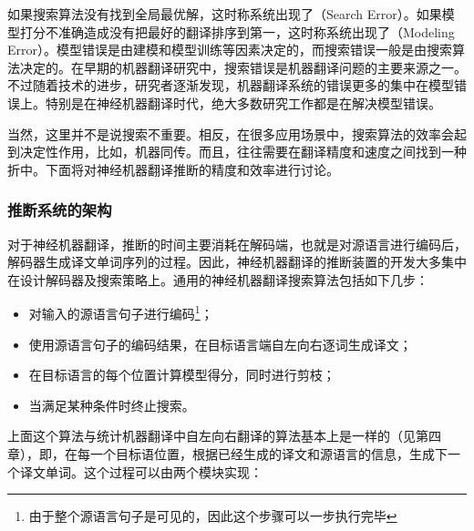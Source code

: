 如果搜索算法没有找到全局最优解，这时称系统出现了{\small{}}（Search Error）。如果模型打分不准确造成没有把最好的翻译排序到第一，这时称系统出现了{\small{}}（Modeling Error）。模型错误是由建模和模型训练等因素决定的，而搜索错误一般是由搜索算法决定的。在早期的机器翻译研究中，搜索错误是机器翻译问题的主要来源之一。不过随着技术的进步，研究者逐渐发现，机器翻译系统的错误更多的集中在模型错误上\cite{DBLP:conf/emnlp/StahlbergB19}。特别是在神经机器翻译时代，绝大多数研究工作都是在解决模型错误。

\parinterval 当然，这里并不是说搜索不重要。相反，在很多应用场景中，搜索算法的效率会起到决定性作用，比如，机器同传\cite{DBLP:journals/corr/abs-1810-08398}。而且，往往需要在翻译精度和速度之间找到一种折中。下面将对神经机器翻译推断的精度和效率进行讨论。


\subsubsection{推断系统的架构}

\parinterval 对于神经机器翻译，推断的时间主要消耗在解码端，也就是对源语言进行编码后，解码器生成译文单词序列的过程。因此，神经机器翻译的推断装置的开发大多集中在设计解码器及搜索策略上。通用的神经机器翻译搜索算法包括如下几步：

\begin{itemize}
\vspace{0.5em}
\item 对输入的源语言句子进行编码\footnote{由于整个源语言句子是可见的，因此这个步骤可以一步执行完毕}；
\vspace{0.5em}
\item 使用源语言句子的编码结果，在目标语言端自左向右逐词生成译文；
\vspace{0.5em}
\item 在目标语言的每个位置计算模型得分，同时进行剪枝；
\vspace{0.5em}
\item 当满足某种条件时终止搜索。
\vspace{0.5em}
\end{itemize}

\parinterval 上面这个算法与统计机器翻译中自左向右翻译的算法基本上是一样的（见第四章），即，在每一个目标语位置，根据已经生成的译文和源语言的信息，生成下一个译文单词。这个过程可以由两个模块实现\cite{DBLP:conf/emnlp/StahlbergHSB17}：

